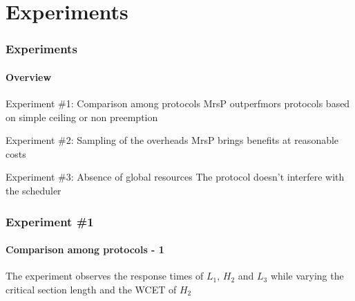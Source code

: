 





\section{Experiments}

\begin{frame}

	\frametitle{Experiments}
	\framesubtitle{Overview}

		\begin{block}{Experiment \#1: Comparison among protocols}
			MrsP outperfmors protocols based on simple ceiling or non preemption
		\end{block}

		\begin{block}{Experiment \#2: Sampling of the overheads}
			MrsP brings benefits at reasonable costs
		\end{block}

		\begin{block}{Experiment \#3: Absence of global resources}
			The protocol doesn't interfere with the scheduler
		\end{block}

\end{frame}


\begin{frame}

	\frametitle{Experiment \#1}
	\framesubtitle{Comparison among protocols - 1}

	The experiment observes the \alert{response times} of $L_1$, $H_2$ and $L_3$ while varying the \alert{critical section length} and the \alert{WCET} of $H_2$

	\vspace{0.2cm}

    \centerline{}

\end{frame}


	


